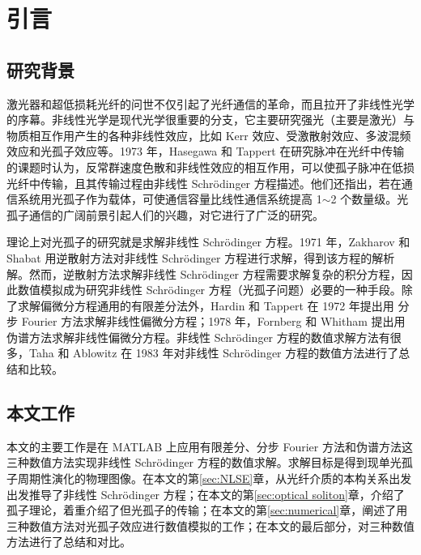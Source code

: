 \section{引言}
\subsection{研究背景}
激光器和超低损耗光纤的问世不仅引起了光纤通信的革命，而且拉开了非线性光学的序幕。非线性光学是现代光学很重要的分支，它主要研究强光（主要是激光）与物质相互作用产生的各种非线性效应，比如 Kerr 效应、受激散射效应、多波混频效应和光孤子效应等。1973 年，Hasegawa 和 Tappert 在研究脉冲在光纤中传输的课题时认为，反常群速度色散和非线性效应的相互作用，可以使孤子脉冲在低损光纤中传输，且其传输过程由非线性 Schr\"odinger 方程描述。他们还指出，若在通信系统用光孤子作为载体，可使通信容量比线性通信系统提高 1$\sim$2 个数量级\cite{Hasegawa}。光孤子通信的广阔前景引起人们的兴趣，对它进行了广泛的研究。

理论上对光孤子的研究就是求解非线性 Schr\"odinger 方程。1971 年，Zakharov 和 Shabat 用逆散射方法对非线性 Schr\"odinger 方程进行求解，得到该方程的解析解。然而，逆散射方法求解非线性 Schr\"odinger 方程需要求解复杂的积分方程，因此数值模拟成为研究非线性 Schr\"odinger 方程（光孤子问题）必要的一种手段。除了求解偏微分方程通用的有限差分法外，Hardin 和 Tappert 在 1972 年提出用 分步 Fourier 方法求解非线性偏微分方程\cite{Tappert}；1978 年，Fornberg 和 Whitham 提出用伪谱方法求解非线性偏微分方程\cite{Fornberg}。非线性 Schr\"odinger 方程的数值求解方法有很多，Taha 和 Ablowitz 在 1983 年对非线性 Schr\"odinger 方程的数值方法进行了总结和比较\cite{Taha}。

\subsection{本文工作}
本文的主要工作是在 MATLAB 上应用有限差分、分步 Fourier 方法和伪谱方法这三种数值方法实现非线性 Schr\"odinger 方程的数值求解。求解目标是得到现单光孤子周期性演化的物理图像。在本文的第\ref{sec:NLSE}章，从光纤介质的本构关系出发出发推导了非线性 Schr\"odinger 方程；在本文的第\ref{sec:optical soliton}章，介绍了孤子理论，着重介绍了但光孤子的传输；在本文的第\ref{sec:numerical}章，阐述了用三种数值方法对光孤子效应进行数值模拟的工作；在本文的最后部分，对三种数值方法进行了总结和对比。